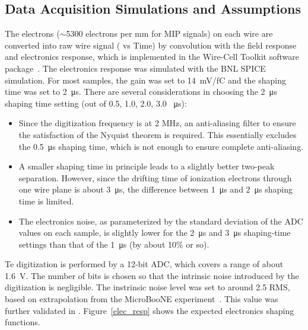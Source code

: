 \subsection{Data Acquisition Simulations and Assumptions}
\label{sec:tools-mc-daq}


  The electrons ($\sim$5300 electrons per mm for MIP signals) on each wire are converted into raw wire signal ( vs Time) by convolution with the field response and electronics response, which is implemented in the Wire-Cell Toolkit software package~\cite{ref:wire_cell_toolkit}.
  The  electronics response was simulated with the BNL SPICE~\cite{spice} simulation.  For most samples, the  gain was set to \SI{14}{mV/fC} and the shaping time was set to \SI{2}{\micro\second}. There are several considerations in choosing the \SI{2}{\micro\second} shaping time setting (out of 0.5, 1.0, 2.0, 3.0 \SI{}{\micro\second}):
  \begin{itemize}
\item Since the digitization frequency is at 2 MHz, an anti-aliasing filter to ensure the satisfaction of the Nyquist theorem is required. This essentially excludes the \SI{0.5}{\micro\second} shaping time, which is not enough  to ensure complete anti-aliasing. 
\item A smaller shaping time in principle leads to a slightly better two-peak separation. However, since the drifting time of ionization electrons through one wire plane is about \SI{3}{\micro\second}, the difference between \SI{1}{\micro\second} and \SI{2}{\micro\second} shaping time is limited. 
\item The electronics noise, as parameterized by the standard deviation of the ADC values on each sample, is slightly lower for the \SI{2}{\micro\second} and \SI{3}{\micro\second} shaping-time settings than that of the \SI{1}{\micro\second} (by about 10\% or so). 
\end{itemize}
Te digitization is performed by a 12-bit ADC, which covers a range of about \SI{1.6}{V}. The number of bits is chosen so that the intrinsic noise
introduced by the digitization is negligible.  The instrinsic noise level was set to around 2.5  RMS, based on extrapolation 
  from the MicroBooNE experiment~\cite{Acciarri:2017sde}. This value was further validated in . %
  Figure~\ref{elec_resp} shows the expected electronics shaping functions.

